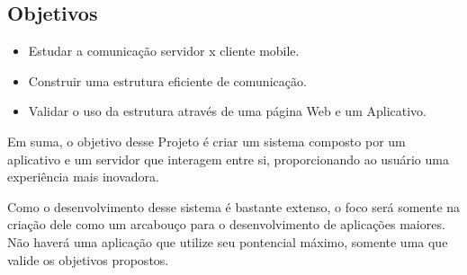 \documentclass[a4paper,12pt]{article}
\begin{document}
\newpage
\subsection{Objetivos}

\begin{itemize}
    \item Estudar a comunicação servidor x cliente mobile.

    \item Construir uma estrutura eficiente de comunicação.

    \item Validar o uso da estrutura através de uma página Web e um Aplicativo.






\end{itemize}



Em suma, o objetivo desse Projeto é criar um sistema composto por um aplicativo e um servidor que interagem entre si, proporcionando ao usuário uma experiência mais inovadora.

Como o desenvolvimento desse sistema é bastante extenso, o foco será somente na criação dele como um arcabouço para o desenvolvimento de aplicações maiores. Não haverá uma aplicação que utilize seu pontencial máximo, somente uma que valide os objetivos propostos.


\end{document}
